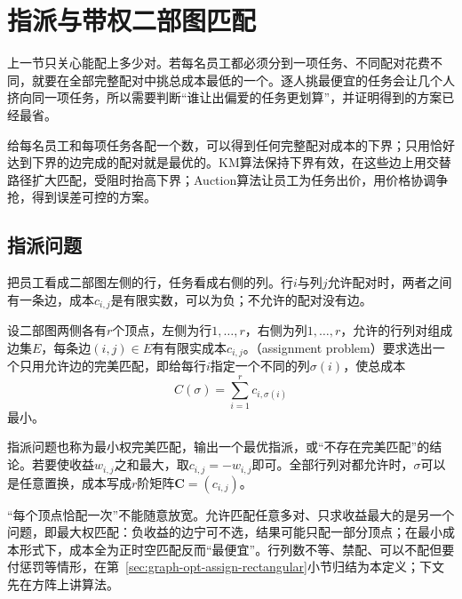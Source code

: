 
\section{指派与带权二部图匹配}
\label{sec:graph-assignment}

上一节只关心能配上多少对。若每名员工都必须分到一项任务、不同配对花费不同，就要在全部完整配对中挑总成本最低的一个。逐人挑最便宜的任务会让几个人挤向同一项任务，所以需要判断“谁让出偏爱的任务更划算”，并证明得到的方案已经最省。

给每名员工和每项任务各配一个数，可以得到任何完整配对成本的下界；只用恰好达到下界的边完成的配对就是最优的。KM算法保持下界有效，在这些边上用交替路径扩大匹配，受阻时抬高下界；Auction算法让员工为任务出价，用价格协调争抢，得到误差可控的方案。

\subsection{指派问题}
\label{sec:graph-opt-assign-problem}

把员工看成二部图左侧的行，任务看成右侧的列。行$i$与列$j$允许配对时，两者之间有一条边，成本$c_{i,j}$是有限实数，可以为负；不允许的配对没有边。

\begin{definition}[指派问题]
\label{def:graph-opt-assignment}
设二部图两侧各有$r$个顶点，左侧为行$1,\ldots,r$，右侧为列$1,\ldots,r$，允许的行列对组成边集$E$，每条边$(i,j)\in E$有有限实成本$c_{i,j}$。（assignment problem）要求选出一个只用允许边的完美匹配，即给每行$i$指定一个不同的列$\sigma(i)$，使总成本
\begin{equation}
  C(\sigma)=\sum_{i=1}^r c_{i,\sigma(i)}
  \label{eq:graph-opt-assignment-cost}
\end{equation}
最小。
\end{definition}

指派问题也称为最小权完美匹配，输出一个最优指派，或“不存在完美匹配”的结论。若要使收益$w_{i,j}$之和最大，取$c_{i,j}=-w_{i,j}$即可。全部行列对都允许时，$\sigma$可以是任意置换，成本写成$r$阶矩阵$\bm C=(c_{i,j})$。

“每个顶点恰配一次”不能随意放宽。允许匹配任意多对、只求收益最大的是另一个问题，即最大权匹配：负收益的边宁可不选，结果可能只配一部分顶点；在最小成本形式下，成本全为正时空匹配反而“最便宜”。行列数不等、禁配、可以不配但要付惩罚等情形，在第~\ref{sec:graph-opt-assign-rectangular}小节归结为本定义；下文先在方阵上讲算法。


